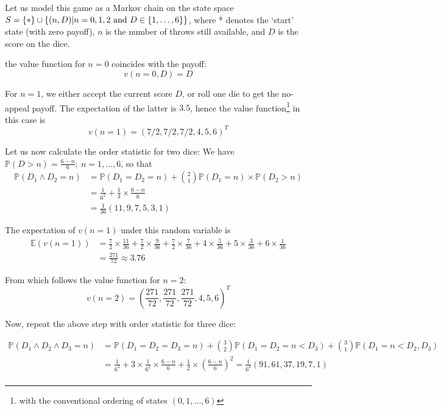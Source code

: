 \documentclass[aps,prl,twocolumn,floatfix,letterpaper]{revtex4}
\newenvironment{solution}[1][Solution]{\begin{trivlist}
    \item[\hskip \labelsep {\bfseries #1}]}{\end{trivlist}}
\newcommand{\PP}{\mathbb{P}}
\newcommand{\EE}{\mathbb{E}}
\begin{document}
\begin{solution}
Let us model this game as a Markov chain on the state space
$S=\{*\} \cup \{(n,D) | n=0,1,2 {\rm \ and\ } D \in \{1,\ldots,6 \} \}$, 
where * denotes the `start' state (with zero payoff), $n$ is the
number of throws still available, and $D$ is the score on the dice.

the value function for $n=0$ coincides with the payoff:
$$
v(n=0,D) = D
$$

For $n=1$, we either accept the current score $D$, or roll one 
die to get the no-appeal payoff. The expectation of the latter is $3.5$, 
hence the value function\footnote{with the conventional ordering of states $(0,1,\ldots,6)$} 
in this case is 
$$
v(n=1) = (7/2,7/2,7/2,4,5,6)^T
$$

Let us now calculate the order statistic for two dice:
We have $\PP(D > n) = \frac{6-n}{6}; \ n=1,\ldots,6$, so that 
\scriptsize
\begin{equation}
\begin{split}
\PP(D_1 \wedge D_2 = n) &= \PP(D_1 = D_2 = n)
		+ {2\choose 1} \PP(D_1 = n) \times \PP(D_2 > n) 	\\
	&= \frac{1}{6^2} 
		+ \frac{1}{3}\times \frac{6-n}{6}			\\
	&= \frac{1}{36} (11,9,7,5,3,1)
\end{split}
\end{equation}
\normalsize

The expectation of $v(n=1)$ under this random variable is
\scriptsize
\begin{equation}
\begin{split}
\EE(v(n=1)) &= \frac{7}{2}\times\frac{11}{36}
	+ \frac{7}{2}\times\frac{9}{36}
	+ \frac{7}{2}\times\frac{7}{36}
	+ 4\times\frac{5}{36}
	+ 5\times\frac{3}{36}
	+ 6\times\frac{1}{36}		\\
	&= \frac{271}{72} \approx 3.76
\end{split}
\end{equation}
\normalsize

From which follows the value function for $n=2$:
$$
v(n=2) = (\frac{271}{72},\frac{271}{72},\frac{271}{72},4,5,6)^T
$$

Now, repeat the above step with order statistic for three dice:
\begin{widetext}
\begin{equation}
\begin{split}
\PP(D_1 \wedge D_2 \wedge D_3 = n) &= \PP(D_1=D_2=D_3=n) 	
				+ {3\choose2} \PP (D_1=D_2=n<D_3)
				+ {3\choose1} \PP (D_1=n<D_2,D_3)		\\
	&= \frac{1}{6^3} 
		+ 3 \times \frac{1}{6^2} \times \frac{6-n}{6}
		+ \frac{1}{2} \times \left(\frac{6-n}{6}\right)^2
	= \frac{1}{6^3} (91,61,37,19,7,1)	\\
\end{split}
\end{equation}
\end{widetext}


\end{solution}
\end{document}
